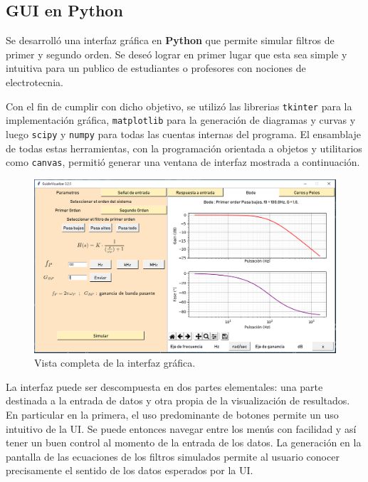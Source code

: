 \documentclass[a4paper]{article}
\begin{document}
\subsection*{GUI en Python}

Se desarrolló una interfaz gráfica en \textbf{Python} que permite simular filtros de primer y segundo orden. Se deseó lograr en primer lugar que esta sea simple y intuitiva para un publico de estudiantes o profesores con nociones de electrotecnia.

\vspace{1em}

Con el fin de cumplir con dicho objetivo, se utilizó las librerias \texttt{tkinter} para la implementación gráfica, \texttt{matplotlib} para la generación de diagramas y curvas y luego \texttt{scipy} y \texttt{numpy} para todas las cuentas internas del programa. El ensamblaje de todas estas herramientas, con la programación orientada a objetos y utilitarios como \texttt{canvas}, permitió generar una ventana de interfaz mostrada a continuación.

\begin{figure}[h]
\begin{center}
\includegraphics[scale=0.35]{PantallaUI}
\caption{Vista completa de la interfaz gráfica.}
\end{center}
\end{figure}

La interfaz puede ser descompuesta en dos partes elementales: una parte destinada a la entrada de datos y otra propia de la visualización de resultados. En particular en la primera, el uso predominante de botones permite un uso intuitivo de la UI. Se puede entonces navegar entre los menús con facilidad y así tener un buen control al momento de la entrada de los datos. La generación en la pantalla de las ecuaciones de los filtros simulados permite al usuario conocer precisamente el sentido de los datos esperados por la UI.
\end{document}
